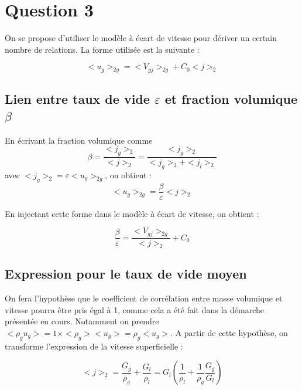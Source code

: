 \section{Question 3\label{section:ex3}}

On se propose d'utiliser le modèle à écart de vitesse pour dériver un certain nombre de relations. La forme utilisée est la suivante :

\begin{equation}
    <u_g>_{2g} = <V_{gj}>_{2g} + C_0 <j>_2
\end{equation}

\subsection{Lien entre taux de vide $\varepsilon$ et fraction volumique $\beta$}

En écrivant la fraction volumique comme 
\begin{equation}
    \beta = \frac{<j_g>_2}{<j>_2} = \frac{<j_g>_2}{<j_g>_2 + <j_l>_2}
\end{equation}
avec $<j_g>_2 = \varepsilon<u_g>_{2g}$, on obtient :
\begin{equation}
    <u_g>_{2g} = \frac{\beta}{\varepsilon}<j>_2
\end{equation}

En injectant cette forme dans le modèle à écart de vitesse, on obtient :

\begin{equation}
\boxed{
    \frac{\beta}{\varepsilon} = \frac{<V_{gj}>_{2g}}{<j>_2} + C_0
    }
\end{equation}

\subsection{Expression pour le taux de vide moyen}

On fera l'hypothèse que le coefficient de corrélation entre masse volumique et vitesse pourra être pris égal à 1, comme cela a été fait dans la démarche présentée en cours. Notamment on prendre $<\rho_g u_g> = 1 \times <\rho_g><u_g> = \rho_g <u_g>$. A partir de cette hypothèse, on transforme l'expression de la vitesse superficielle :

\begin{equation}
    <j>_2 = \frac{G_g}{\rho_g} + \frac{G_l}{\rho_l} = G_l \left( \frac{1}{\rho_l} + \frac{1}{\rho_g} \frac{G_g}{G_l} \right)
\end{equation}

